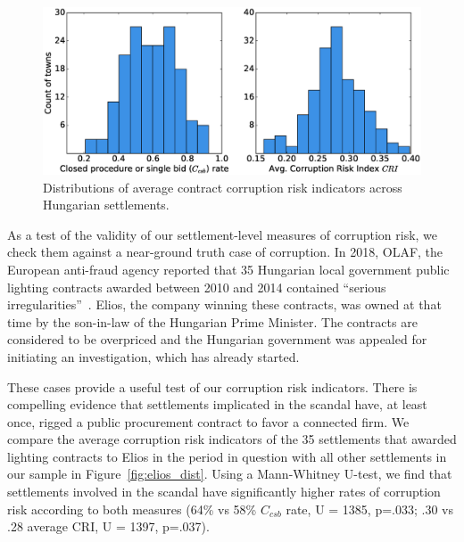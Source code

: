 \begin{figure}
\includegraphics[width=\textwidth]{images/iwiw/cr_dists2.eps}
\caption{Distributions of average contract corruption risk indicators across Hungarian settlements.}
\label{fig:crisk_dists}
\end{figure}

As a test of the validity of our settlement-level measures of corruption risk, we check them against a near-ground truth case of corruption. In 2018, OLAF, the European anti-fraud agency reported that 35 Hungarian local government public lighting contracts awarded between 2010 and 2014 contained ``serious irregularities''~\cite{elios,norman_komuves_2018}. Elios, the company winning these contracts, was owned at that time by the son-in-law of the Hungarian Prime Minister. The contracts are considered to be overpriced and the Hungarian government was appealed for initiating an investigation, which has already started.

These cases provide a useful test of our corruption risk indicators. There is compelling evidence that settlements implicated in the scandal have, at least once, rigged a public procurement contract to favor a connected firm. We compare the average corruption risk indicators of the 35 settlements that awarded lighting contracts to Elios in the period in question with all other settlements in our sample in Figure~\ref{fig:elios_dist}. Using a Mann-Whitney U-test, we find that settlements involved in the scandal have significantly higher rates of corruption risk according to both measures (64\% vs 58\% $C_{csb}$ rate, U = 1385, p=.033; .30 vs .28 average CRI, U = 1397, p=.037). 

